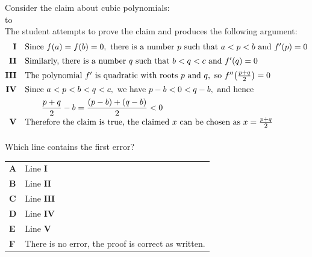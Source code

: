 \documentclass[11pt,a4paper]{article}
\begin{document}
\begin{enumerate}[label=\textbf{\arabic*.},leftmargin=*,itemsep=0pt,start=12]
Consider the claim about cubic polynomials: \\[-5pt]

\noindent\hbox to  \\

The student attempts to prove the claim and produces the following argument:
\[
\begin{array}{@{}rl@{}}
\mathbf{I} & \text{Since } f(a)=f(b)=0,\text{ there is a number }p\text{ such that }a<p<b\text{ and }f'(p)=0 \\[5pt]
\mathbf{II} & \text{Similarly, there is a number }q\text{ such that }b<q<c\text{ and }f'(q)=0 \\[5pt]
\mathbf{III} & \text{The polynomial }f'\text{ is quadratic with roots }p\text{ and }q,\text{ so }f''\!\left(\frac{p+q}{2}\right)=0 \\[5pt]
\mathbf{IV} &
\text{Since }a<p<b<q<c,\text{ we have }p-b<0<q-b,\text{ and hence}\\[4pt]
&\displaystyle\qquad
\frac{p+q}{2}-b
=\frac{(p-b)+(q-b)}{2}<0 \\[5pt]
\mathbf{V} & \text{Therefore the claim is true, the claimed } x \text{ can be chosen as } x=\frac{p+q}{2}\\[5pt]
\end{array}
\]

Which line contains the first error?

\par\vspace*{12pt}
\begin{tabularx}{\linewidth}{@{}>{\bfseries}l Y@{}}
A &
Line $\mathbf{I}$
\\[0.8em]
B &
Line $\mathbf{II}$
\\[0.8em]
C &
Line $\mathbf{III}$
\\[0.8em]
D &
Line $\mathbf{IV}$
\\[0.8em]
E &
Line $\mathbf{V}$
\\[0.8em]
F &
There is no error, the proof is correct as written.
\\
\end{tabularx}


\end{enumerate}
\end{document}
